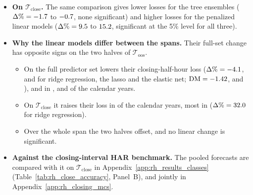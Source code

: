 \begin{itemize}
  or larger in absolute value), and the full set is significantly more accurate than the same class's HAR benchmark
  set plus realized moments in \rhabNClassesBeatAddRmClose{} of the \rhabNClassesAddRm{} classes (its loss relative
  to that benchmark: \rhabLgbmFullVsAddRmClosePct\% for LightGBM, \rhabXgbFullVsAddRmClosePct\% for XGBoost).
\item \textbf{On $\mathcal T_{\mathrm{close}}$.} The same comparison gives lower losses for the tree ensembles
  ($\Delta\% = -1.7$ to $-0.7$, none significant) and higher losses for the
  penalized linear models ($\Delta\% = 9.5$ to $15.2$, significant at the 5\%
  level for all three). %
\item \textbf{Why the linear models differ between the spans.} Their full-set change has opposite signs on the two
  halves of $\mathcal T_{\mathrm{oos}}$.
  \begin{itemize}
  \item On \rhcaYearsPre{} the full predictor set lowers their closing-half-hour loss ($\Delta\% =
    -4.1$, \rhcaPctLassoClosePre{} and \rhcaPctEnetClosePre{} for ridge regression, the lasso and
    the elastic net; $\mathrm{DM} = -1.42$, \rhcaDmLassoClosePre{} and \rhcaDmEnetClosePre), and in
    \rhcaYrsDownRidgeClosePre, \rhcaYrsDownLassoClosePre{} and \rhcaYrsDownEnetClosePre{} of the \rhcaNYrsPre{}
    calendar years.
  \item On $\mathcal T_{\mathrm{close}}$ it raises their loss in \rhcaYrsUpRidgeCloseOos{} of the \rhcaNYrsOos{}
    calendar years, most in \rhcaWorstYrRidgeCloseOos{} ($\Delta\% = 32.0$ for ridge
    regression).
  \item Over the whole span the two halves offset, and no linear change is significant.
  \end{itemize}
\item \textbf{Against the closing-interval HAR benchmark.} The pooled forecasts are compared with it on
  $\mathcal T_{\mathrm{close}}$ in Appendix~\ref{app:rh_results_classes} (Table~\ref{tab:rh_close_accuracy},
  Panel~B), and jointly in Appendix~\ref{app:rh_closing_mcs}.
\end{itemize}


